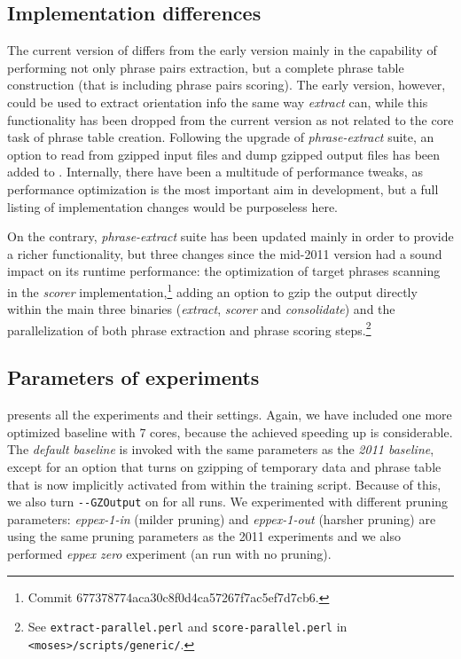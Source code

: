 \subsection{Implementation differences}

The current version of \eppex{} differs from the early version mainly in the
capability of performing not only phrase pairs extraction, but a complete
phrase table construction (that is including phrase pairs scoring).
The early version, however, could be used to extract orientation info
the same way \emph{extract} can, while this functionality has been dropped
from the current version as not related to the core task of phrase table creation.
Following the upgrade of \emph{phrase-extract} suite, an option to read from
gzipped input files and dump gzipped output files has been added to \eppex{}.
Internally, there have been a multitude of performance tweaks,
as performance optimization is the most important aim in \eppex{} development,
but a full listing of implementation changes would be purposeless here.

On the contrary, \emph{phrase-extract} suite has been updated mainly in order to
provide a richer functionality, but three changes since the mid-2011 version
had a sound impact on its runtime performance: the optimization of target phrases
scanning in the \emph{scorer} implementation,\footnote{Commit 677378774aca30c8f0d4ca57267f7ac5ef7d7cb6.}
adding an option to gzip the output directly within the main three binaries
(\emph{extract}, \emph{scorer} and \emph{consolidate})
and the parallelization of both phrase extraction and phrase scoring
steps.\footnote{See \texttt{extract-parallel.perl} and \texttt{score-parallel.perl}
in \texttt{<moses>/scripts/generic/}.}

\subsection{Parameters of experiments}

 presents all the experiments and their settings.
Again, we have included one more optimized baseline with 7 cores, because
the achieved speeding up is considerable.
The \emph{default baseline} is invoked with the same parameters as the \emph{2011
baseline}, except for an option that turns on gzipping of temporary data and
phrase table that is now implicitly activated from within the training script.
Because of this, we also turn \verb|--GZOutput| on for all \eppex{} runs.
We experimented with different pruning parameters: \emph{eppex-1-in} (milder
pruning) and \emph{eppex-1-out} (harsher pruning) are using the same pruning
parameters as the 2011 experiments and we also performed \emph{eppex zero}
experiment (an \eppex{} run with no pruning).


